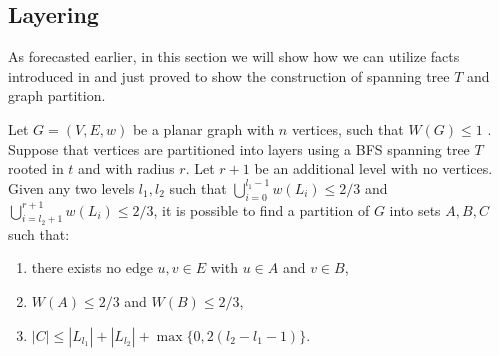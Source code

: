 \subsection{Layering}
As forecasted earlier, in this section we will show how we can utilize facts introduced
in  and just proved  to show the 
construction of spanning tree $T$ and graph partition. 
\begin{lemma} \cite{liptonSeparatorTheoremPlanar1979} \label{lem:layering}
    Let $G = (V, E, w)$ be a planar graph with $n$ vertices, such that $W(G) \leq 1$
    . Suppose that vertices are partitioned into
    layers using a BFS spanning tree $T$ rooted in $t$ and with radius $r$. Let
    $r+1$ be an additional level with no vertices. Given any two levels $l_1,
    l_2$ such that $\bigcup_{i=0}^{l_1-1} w(L_i) \leq 2/3$
    and $\bigcup_{i = l_2 + 1}^{r+1} w(L_i) \leq 2/3$, it is possible to find a partition of $G$ into
    sets $A, B, C$ such that:

    \begin{enumerate}
        \item[(a)] there exists no edge ${u, v} \in E$ with $u \in A$ and $v \in B$,
        \item[(b)] $W(A) \leq 2/3$ and $W(B) \leq 2/3$,
        \item[(c)] $|C| \leq |L_{l_1}| + |L_{l_2}| + \max \{ 0, 2(l_2 - l_1 - 1) \}$. 
    \end{enumerate}
\end{lemma}

